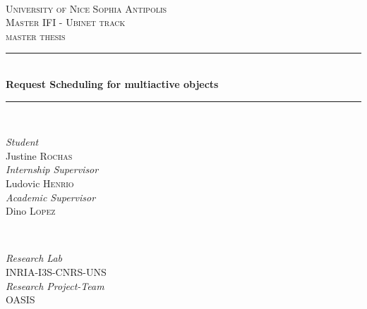 \documentclass[11pt]{report}
\begin{document}
\onehalfspacing
\begin{titlepage}

\newcommand{\HRule}{\rule{\linewidth}{0.5mm}} %

\center %
 
\textbf{}\\[0.5cm]
\textsc{\LARGE University of Nice Sophia Antipolis}\\[1cm] %
\textsc{\Large Master IFI - Ubinet track}\\[0.5cm] %
\textsc{\large master thesis}\\[0.5cm] %


\HRule \\[0.4cm]
{ \huge \bfseries Request Scheduling for multiactive objects}\\[0.4cm] %
\HRule \\[1cm]
 
\begin{minipage}{0.48\textwidth}
\center
\Large \emph{Student}\\
Justine \textsc{Rochas}\\[0.5cm]%
\emph{Internship Supervisor} \\
Ludovic \textsc{Henrio}\\[0.5cm]%
\emph{Academic Supervisor} \\
Dino \textsc{Lopez}\\[0.5cm]%
\end{minipage}
~
\begin{minipage}{0.48\textwidth}
\center
\Large \emph{Research Lab}\\
\textsc{INRIA-I3S-CNRS-UNS} \\[0.5cm]%
\emph{Research Project-Team}\\
\textsc{OASIS}\\[0.5cm] %
\end{minipage}\\[4cm]


\end{titlepage}
\end{document}

